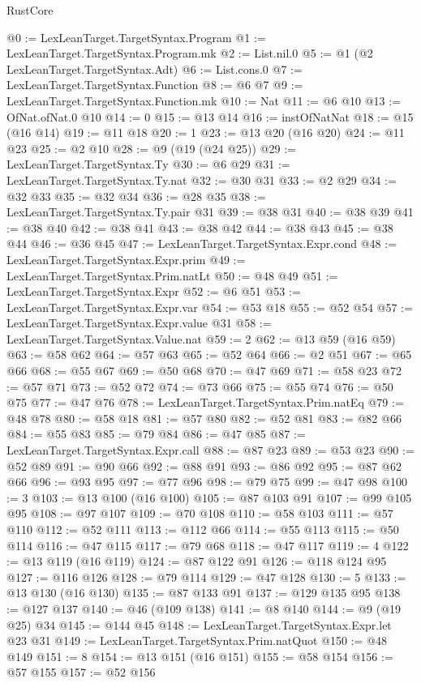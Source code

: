 \begin{lexlean}{RustCore}
\begin{coremodule}
@0 := LexLeanTarget.TargetSyntax.Program
@1 := LexLeanTarget.TargetSyntax.Program.mk
@2 := List.nil.{0}
@5 := @1 (@2 LexLeanTarget.TargetSyntax.Adt)
@6 := List.cons.{0}
@7 := LexLeanTarget.TargetSyntax.Function
@8 := @6 @7
@9 := LexLeanTarget.TargetSyntax.Function.mk
@10 := Nat
@11 := @6 @10
@13 := OfNat.ofNat.{0} @10
@14 := 0
@15 := @13 @14
@16 := instOfNatNat
@18 := @15 (@16 @14)
@19 := @11 @18
@20 := 1
@23 := @13 @20 (@16 @20)
@24 := @11 @23
@25 := @2 @10
@28 := @9 (@19 (@24 @25))
@29 := LexLeanTarget.TargetSyntax.Ty
@30 := @6 @29
@31 := LexLeanTarget.TargetSyntax.Ty.nat
@32 := @30 @31
@33 := @2 @29
@34 := @32 @33
@35 := @32 @34
@36 := @28 @35
@38 := LexLeanTarget.TargetSyntax.Ty.pair @31
@39 := @38 @31
@40 := @38 @39
@41 := @38 @40
@42 := @38 @41
@43 := @38 @42
@44 := @38 @43
@45 := @38 @44
@46 := @36 @45
@47 := LexLeanTarget.TargetSyntax.Expr.cond
@48 := LexLeanTarget.TargetSyntax.Expr.prim
@49 := LexLeanTarget.TargetSyntax.Prim.natLt
@50 := @48 @49
@51 := LexLeanTarget.TargetSyntax.Expr
@52 := @6 @51
@53 := LexLeanTarget.TargetSyntax.Expr.var
@54 := @53 @18
@55 := @52 @54
@57 := LexLeanTarget.TargetSyntax.Expr.value @31
@58 := LexLeanTarget.TargetSyntax.Value.nat
@59 := 2
@62 := @13 @59 (@16 @59)
@63 := @58 @62
@64 := @57 @63
@65 := @52 @64
@66 := @2 @51
@67 := @65 @66
@68 := @55 @67
@69 := @50 @68
@70 := @47 @69
@71 := @58 @23
@72 := @57 @71
@73 := @52 @72
@74 := @73 @66
@75 := @55 @74
@76 := @50 @75
@77 := @47 @76
@78 := LexLeanTarget.TargetSyntax.Prim.natEq
@79 := @48 @78
@80 := @58 @18
@81 := @57 @80
@82 := @52 @81
@83 := @82 @66
@84 := @55 @83
@85 := @79 @84
@86 := @47 @85
@87 := LexLeanTarget.TargetSyntax.Expr.call
@88 := @87 @23
@89 := @53 @23
@90 := @52 @89
@91 := @90 @66
@92 := @88 @91
@93 := @86 @92
@95 := @87 @62 @66
@96 := @93 @95
@97 := @77 @96
@98 := @79 @75
@99 := @47 @98
@100 := 3
@103 := @13 @100 (@16 @100)
@105 := @87 @103 @91
@107 := @99 @105 @95
@108 := @97 @107
@109 := @70 @108
@110 := @58 @103
@111 := @57 @110
@112 := @52 @111
@113 := @112 @66
@114 := @55 @113
@115 := @50 @114
@116 := @47 @115
@117 := @79 @68
@118 := @47 @117
@119 := 4
@122 := @13 @119 (@16 @119)
@124 := @87 @122 @91
@126 := @118 @124 @95
@127 := @116 @126
@128 := @79 @114
@129 := @47 @128
@130 := 5
@133 := @13 @130 (@16 @130)
@135 := @87 @133 @91
@137 := @129 @135 @95
@138 := @127 @137
@140 := @46 (@109 @138)
@141 := @8 @140
@144 := @9 (@19 @25) @34
@145 := @144 @45
@148 := LexLeanTarget.TargetSyntax.Expr.let @23 @31
@149 := LexLeanTarget.TargetSyntax.Prim.natQuot
@150 := @48 @149
@151 := 8
@154 := @13 @151 (@16 @151)
@155 := @58 @154
@156 := @57 @155
@157 := @52 @156

\end{coremodule}
\end{lexlean}
